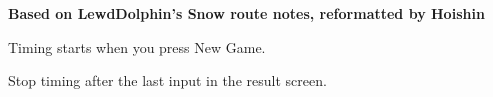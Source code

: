 \documentclass[a4paper, fontsize=11pt, DIV=26, parskip=full]{scrartcl}
\begin{document}
\textbf{\Large Based on LewdDolphin's Snow route notes, reformatted by Hoishin}

Timing starts when you press New Game.

\hrulefill

\hrulefill

\hrulefill

\hrulefill

\hrulefill

\hrulefill

\hrulefill

\hrulefill

\hrulefill

\hrulefill

\hrulefill

\hrulefill

\hrulefill


Stop timing after the last input in the result screen.
\end{document}
